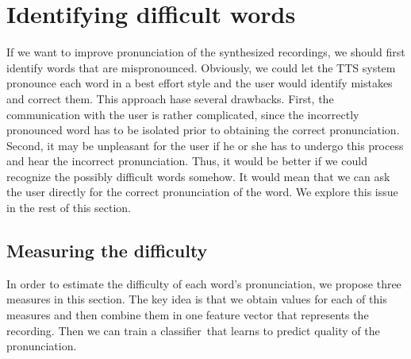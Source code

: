 \section{Identifying difficult words}
If we want to improve pronunciation of the synthesized recordings, we should first identify words that are mispronounced. Obviously, we could let the TTS system pronounce each word in a best effort style and  the user would identify mistakes and correct them. This approach hase several drawbacks. First, the communication with the user is rather complicated, since the incorrectly pronounced word has to be isolated prior to obtaining the correct pronunciation.
Second, it may be unpleasant for the user if he or she has to undergo this process and hear the incorrect pronunciation. Thus, it would be better if we could recognize the possibly difficult words somehow. It would mean that we can ask the user directly for the correct pronunciation of the word. We explore this issue in the rest of this section.
\subsection{Measuring the difficulty}
In order to estimate the difficulty of each word's pronunciation, we propose three measures in this section. The key idea is that we obtain values for each of this measures and then combine them in one feature vector that represents the recording.
Then we can train a classifier\ that learns to predict quality of the pronunciation.
